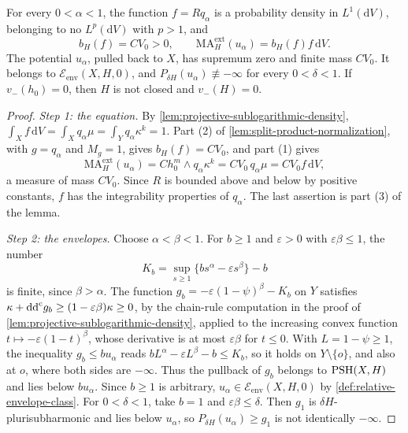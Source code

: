 \begin{theorem}\label{thm:zero-lower-mass-product-equation}
For every $0<\alpha<1$, the function $f=Rq_\alpha$ is a probability density in $L^1(\mathrm{d}V)$, belonging to no $L^p(\mathrm{d}V)$ with $p>1$, and
\[
 b_H(f)=CV_0>0,\qquad
 \mathrm{MA}^{\mathrm{ext}}_H(u_\alpha)=b_H(f)f\,\mathrm{d}V.
\]
The potential $u_\alpha$, pulled back to $X$, has supremum zero and finite mass $CV_0$. It belongs to $\mathcal E_{\mathrm{env}}(X,H,0)$, and $P_{\delta H}(u_\alpha)\not\equiv-\infty$ for every $0<\delta<1$. If $v_-(h_0)=0$, then $H$ is not closed and $v_-(H)=0$.
\end{theorem}
\begin{proof}
\emph{Step 1: the equation.} By \cref{lem:projective-sublogarithmic-density}, $\int_Xf\,\mathrm{d}V=\int_Xq_\alpha\mu=\int_Yq_\alpha\kappa^k=1$. Part (2) of \cref{lem:split-product-normalization}, with $g=q_\alpha$ and $M_g=1$, gives $b_H(f)=CV_0$, and part (1) gives
\[
 \mathrm{MA}^{\mathrm{ext}}_H(u_\alpha)=Ch_0^m\wedge q_\alpha\kappa^k
 =CV_0\,q_\alpha\mu=CV_0f\,\mathrm{d}V,
\]
a measure of mass $CV_0$. Since $R$ is bounded above and below by positive constants, $f$ has the integrability properties of $q_\alpha$. The last assertion is part (3) of the lemma.

\emph{Step 2: the envelopes.} Choose $\alpha<\beta<1$. For $b\geq1$ and $\varepsilon>0$ with $\varepsilon\beta\leq1$, the number
\[
 K_b=\sup_{s\geq1}\{b s^\alpha-\varepsilon s^\beta\}-b
\]
is finite, since $\beta>\alpha$. The function $g_b=-\varepsilon(1-\psi)^\beta-K_b$ on $Y$ satisfies $\kappa+\mathrm{dd}^{\mathrm{c}} g_b\geq(1-\varepsilon\beta)\kappa\geq0$, by the chain-rule computation in the proof of \cref{lem:projective-sublogarithmic-density}, applied to the increasing convex function $t\mapsto-\varepsilon(1-t)^\beta$, whose derivative is at most $\varepsilon\beta$ for $t\leq0$. With $L=1-\psi\geq1$, the inequality $g_b\leq bu_\alpha$ reads $bL^\alpha-\varepsilon L^\beta-b\leq K_b$, so it holds on $Y\setminus\{o\}$, and also at $o$, where both sides are $-\infty$. Thus the pullback of $g_b$ belongs to $\mathrm{PSH}(X,H)$ and lies below $bu_\alpha$. Since $b\geq1$ is arbitrary, $u_\alpha\in\mathcal E_{\mathrm{env}}(X,H,0)$ by \cref{def:relative-envelope-class}. For $0<\delta<1$, take $b=1$ and $\varepsilon\beta\leq\delta$. Then $g_1$ is $\delta H$-plurisubharmonic and lies below $u_\alpha$, so $P_{\delta H}(u_\alpha)\geq g_1$ is not identically $-\infty$.
\end{proof}

